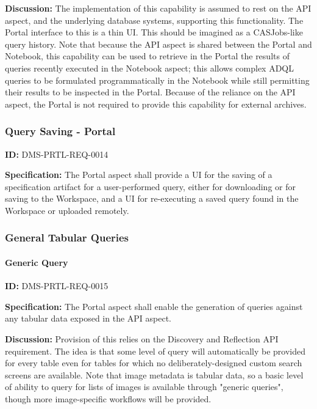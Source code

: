 \documentclass[SE,toc,lsstdraft]{lsstdoc}
\begin{document}
\textbf{Discussion:}
The implementation of this capability is assumed to rest on the API aspect, and the underlying database systems, supporting this functionality. The Portal interface to this is a thin UI.  This should be imagined as a CASJobs-like query history.
Note that because the API aspect is shared between the Portal and Notebook, this capability can be used to retrieve in the Portal the results of queries recently executed in the Notebook aspect; this allows complex ADQL queries to be formulated programmatically in the Notebook while still permitting their results to be inspected in the Portal.
Because of the reliance on the API aspect, the Portal is not required to provide this capability for external archives.

\subsubsection{Query Saving - Portal}

\label{DMS-PRTL-REQ-0014}
\textbf{ID:} DMS-PRTL-REQ-0014

\textbf{Specification:}
The Portal aspect shall provide a UI for the saving of a specification artifact for a user-performed query, either for downloading or for saving to the Workspace, and a UI for re-executing a saved query found in the Workspace or uploaded remotely.

\subsubsection{General Tabular Queries}

\paragraph{Generic Query}\hfill  %

\label{DMS-PRTL-REQ-0015}
\textbf{ID:} DMS-PRTL-REQ-0015

\textbf{Specification:}
The Portal aspect shall enable the generation of queries against any tabular data exposed in the API aspect.

\textbf{Discussion:}
Provision of this relies on the Discovery and Reflection API requirement.  The idea is that some level of query will automatically be provided for every table even for tables for which no deliberately-designed custom search screens are available.
Note that image metadata is tabular data, so a basic level of ability to query for lists of images is available through "generic queries", though more image-specific workflows will be provided.
\end{document}
